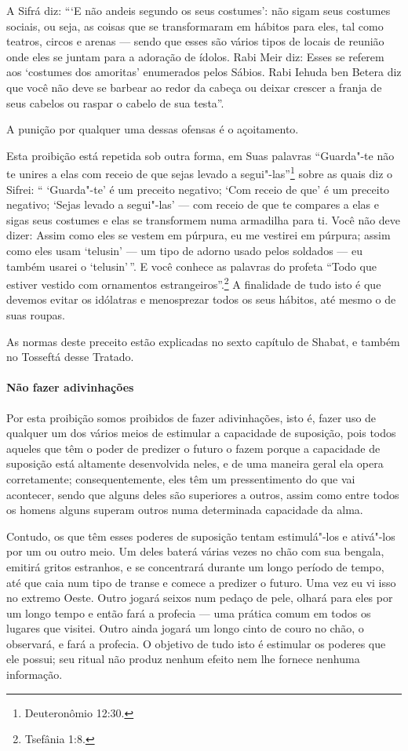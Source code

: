 \begin{multicols}{2}
A Sifrá\starr{} diz: ```E não andeis segundo os seus costumes': não sigam seus
costumes sociais, ou seja, as coisas que se transformaram em hábitos
para eles, tal como teatros, circos e arenas --- sendo que esses são
vários tipos de locais de reunião onde eles se juntam para a adoração de
ídolos. Rabi Meir\starr{} diz: Esses se referem aos `costumes dos amoritas\starr'
enumerados pelos Sábios. Rabi Iehuda ben Betera\starr{} diz que você não deve se
barbear ao redor da cabeça ou deixar crescer a franja de seus cabelos ou
raspar o cabelo de sua testa''.

A punição por qualquer uma dessas ofensas é o açoitamento.

Esta proibição está repetida sob outra forma, em Suas palavras
``Guarda"-te não te unires a elas com receio de que sejas levado a
segui"-las''\footnote{Deuteronômio 12:30.} sobre as quais diz o Sifrei\starr: ``
`Guarda"-te' é um preceito negativo; `Com receio de que' é um preceito
negativo; `Sejas levado a segui"-las' --- com receio de que te compares a
elas e sigas seus costumes e elas se transformem numa armadilha para ti.
Você não deve dizer: Assim como eles se vestem em púrpura, eu me
vestirei em púrpura; assim como eles usam `telusin' --- um tipo de
adorno usado pelos soldados --- eu também usarei o `telusin'\,''. E você
conhece as palavras do profeta ``Todo que estiver vestido com ornamentos
estrangeiros''.\footnote{Tsefânia 1:8.} A finalidade de tudo isto é que
devemos evitar os idólatras e menosprezar todos os seus hábitos, até
mesmo o de suas roupas.

As normas deste preceito estão explicadas no sexto capítulo de Shabat, e
também no Tosseftá\starr{} desse Tratado.

\paragraph{Não fazer adivinhações}

Por esta proibição somos proibidos de fazer adivinhações, isto é, fazer
uso de qualquer um dos vários meios de estimular a capacidade de
suposição, pois todos aqueles que têm o poder de predizer o futuro o
fazem porque a capacidade de suposição está altamente desenvolvida
neles, e de uma maneira geral ela opera corretamente; consequentemente,
eles têm um pressentimento do que vai acontecer, sendo que alguns deles
são superiores a outros, assim como entre todos os homens alguns superam
outros numa determinada capacidade da alma.

Contudo, os que têm esses poderes de suposição tentam estimulá"-los e
ativá"-los por um ou outro meio. Um deles baterá várias vezes no chão com
sua bengala, emitirá gritos estranhos, e se concentrará durante um longo
período de tempo, até que caia num tipo de transe e comece a predizer o
futuro. Uma vez eu vi isso no extremo Oeste. Outro jogará seixos num
pedaço de pele, olhará para eles por um longo tempo e então fará a
profecia --- uma prática comum em todos os lugares que visitei. Outro
ainda jogará um longo cinto de couro no chão, o observará, e fará a
profecia. O objetivo de tudo isto é estimular os poderes que ele
possui; seu ritual não produz nenhum efeito nem lhe fornece nenhuma
informação.


\end{multicols}
